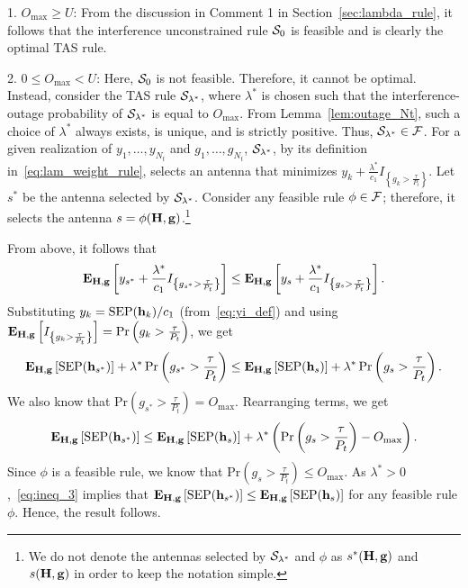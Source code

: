 \documentclass[12pt,draftcls,peerreview,onecolumn]{IEEEtran}
\newcommand{\brac}[1]{\left({#1}\right)}
\newcommand{\cbrac}[1]{\left\{{#1}\right\}}
\newcommand{\indic}[1]{I_{\cbrac{#1}}}
\newcommand{\mtx}[1]{{\bf #1}} %
\newcommand{\explow}[2]{{\bf{E}}_{#1}\left[{#2}\right]}
\newcommand{\prob}[1]{\text{Pr}\brac{#1}}
\newcommand{\SEP}{\text{SEP}}
\newcommand{\lam}{\lambda}
\newcommand{\lamstar}{\lam^{*}}
\newcommand{\sstar}{s^{*}}
\newcommand{\F}{\cal{F}}
\newcommand{\Nt}{{N_t}}
\newcommand{\Pt}{{P_t}}
\newcommand{\puch}{g}
\newcommand{\gk}[1]{{\puch_{#1}}}
\newcommand{\g}{\mathbf{\puch}}
\newcommand{\outmax}{O_{\text{max}}}
\newcommand{\itau}{\tau}
\newcommand{\cone}{c_{1}}
\newcommand{\taubypt}{\frac{\itau}{\Pt}}
\newcommand{\gkgrtaubypt}[1]{{\gk{#1}}>\taubypt}
\newcommand{\gindic}[1]{\indic{\gkgrtaubypt{#1}}}
\newcommand{\yk}[1]{y_{#1}}
\newcommand{\un}{U}
\newcommand{\asrule}{\phi}
\newcommand{\Hmx}{\mtx{H}}
\newcommand{\caluncons}{{\cal S_{\text{0}}}}
\newcommand{\callamstarrule}{\cal S_{\lam^{*}}}
\begin{document}
{ 1. $\outmax\geq\un$:} From the discussion in Comment 1 in Section~\ref{sec:lambda_rule}, it follows that the interference unconstrained rule $\caluncons$ is feasible and is clearly the optimal TAS rule. 

{2. $0\leq\outmax<\un$:} Here, $\caluncons$ is not feasible. Therefore, it cannot be optimal.  Instead, consider the TAS rule $\callamstarrule$, where $\lamstar$ is chosen such that the interference-outage probability of $\callamstarrule$ is equal to $\outmax$. From Lemma~\ref{lem:outage_Nt}, such a choice of $\lamstar$ always exists, is unique, and is strictly positive. Thus, $\callamstarrule\in\F$. For a given realization of $\yk{1},\ldots,\yk{\Nt}$ and $\gk{1},\ldots,\gk{\Nt}$,   $\callamstarrule$, by its definition in~\eqref{eq:lam_weight_rule}, selects an antenna that minimizes $\yk{k} + \frac{\lamstar}{\cone}\gindic{k}$. Let $\sstar$ be the antenna selected by $\callamstarrule$. Consider any feasible rule $\asrule\in\F$; therefore, it selects the antenna  $s=\phi(\Hmx,\g)$.\footnote{We do not denote the antennas selected by $\callamstarrule$ and $\phi$ as $s^*(\Hmx,\g)$ and $s(\Hmx,\g)$ in order to keep the notation simple.} 

From above, it follows that   
\begin{equation}
\label{eq:opt_rul_1}  
   \explow{\Hmx,\g}{\yk{{\sstar}} + \frac{\lamstar}{\cone}\gindic{{\sstar}}} \leq  \explow{\Hmx,\g}{\yk{{s}} + \frac{\lamstar}{\cone}\gindic{{s}}}.
\end{equation}
%
Substituting $\yk{k}={\SEP(\bhk{k})}/{\cone}$ (from~\eqref{eq:yi_def}) and using $\explow{\Hmx,\g}{\gindic{k}}=\prob{\gk{k}>\taubypt}$, we get
%
\begin{equation}
\label{eq:opt_rul_2}
   \explow{\Hmx,\g}{\SEP(\hsstar)} + \lamstar \, \prob{\gk{\sstar}>\taubypt} \leq  \explow{\Hmx,\g}{\SEP(\hs)} + \lamstar \, \prob{\gk{s}>\taubypt}.
\end{equation}
%
We also know that $\prob{\gk{\sstar}>\taubypt}=\outmax$. Rearranging terms, we get
%
\begin{equation}
\label{eq:ineq_3}
\explow{\Hmx,\g}{\SEP(\hsstar)} \leq \explow{\Hmx,\g}{\SEP(\hs)} + \lamstar \left( \prob{\gk{s}>\taubypt} -  \outmax \right).
\end{equation}
%
Since $\phi$ is a feasible rule, we know that $\prob{\gkgrtaubypt{s}}\leq \outmax$. As $\lamstar>0$,~\eqref{eq:ineq_3} implies that $\explow{\Hmx,\g}{\SEP(\hsstar)} \leq \explow{\Hmx,\g}{\SEP(\hs)}$ for any feasible rule $\phi$. Hence, the result follows. %
\end{document}
